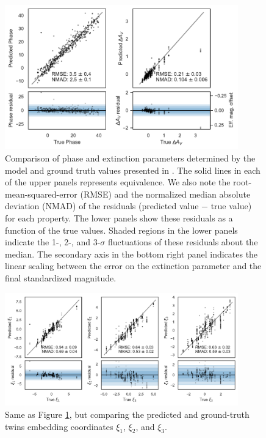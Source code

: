 \begin{figure}
    \centering
    \includegraphics[width=0.9\textwidth]{figures/nn_twins/scatter_spec2embed_phase_color_mag.pdf}
    \caption{Comparison of phase and extinction parameters determined by the \stoe{} model and ground truth values presented in . The solid lines in each of the upper panels represents equivalence. We also note the root-mean-squared-error (RMSE) and the normalized median absolute deviation (NMAD) of the residuals (predicted value $-$ true value) for each property. The lower panels show these residuals as a function of the true values. Shaded regions in the lower panels indicate the 1-, 2-, and 3-$\sigma$ fluctuations of these residuals about the median. The secondary axis in the bottom right panel indicates the linear scaling between the error on the extinction parameter and the final standardized magnitude.}
    \label{fig:scatter_spec2embed_phase_color}
\end{figure}

\begin{figure}
    \centering
    \includegraphics[width=0.9\textwidth]{figures/nn_twins/scatter_spec2embed_coords.pdf}
    \caption{Same as Figure \ref{fig:scatter_spec2embed_phase_color}, but comparing the predicted and ground-truth twins embedding coordinates $\xi_1$, $\xi_2$, and $\xi_3$.}
    \label{fig:scatter_spec2embed_coords}
\end{figure}

